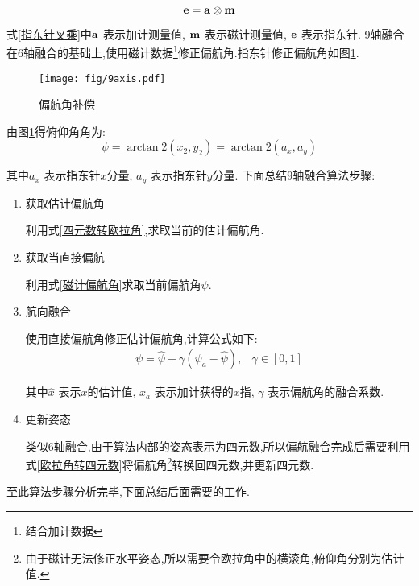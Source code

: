 \begin{equation}\label{指东针叉乘}
    \mathbf{e} = \mathbf{a} \otimes \mathbf{m}
\end{equation} 

式\ref{指东针叉乘}中$\mathbf{a}$   表示加计测量值,
$\mathbf{m}$       表示磁计测量值,
$\mathbf{e}$       表示指东针.
9轴融合在6轴融合的基础上,使用磁计数据\footnote{结合加计数据}修正偏航角.指东针修正偏航角如图\ref{偏航角补偿}.
\begin{figure}[h]
\begin{center}
    \texttt{[image: fig/9axis.pdf]}
    \caption{偏航角补偿}\label{偏航角补偿}
\end{center}
\end{figure}
由图\ref{偏航角补偿}得俯仰角角为:
\begin{equation}\label{磁计偏航角}
    \psi = \arctan2(x_2,y_2) = \arctan2(a_x,a_y)
\end{equation} 

其中$a_x$   表示指东针$x$分量,
$a_y$       表示指东针$y$分量.
下面总结9轴融合算法步骤:
\begin{enumerate}
    \item 获取估计偏航角

        利用式\ref{四元数转欧拉角},求取当前的估计偏航角.
    \item 获取当直接偏航

        利用式\ref{磁计偏航角}求取当前偏航角$\psi$.
    \item 航向融合

        使用直接偏航角修正估计偏航角,计算公式如下:
        \begin{equation}\label{偏航融合}
            \begin{array}{ll}
                    \psi   = \hat{\psi} + \gamma(\psi_a - \hat{\psi}), & \gamma \in [0, 1]
            \end{array}
        \end{equation} 
            
            其中$\hat{x}$   表示$x$的估计值, 
            $x_a$           表示加计获得的$x$指,
            $\gamma$        表示偏航角的融合系数.
    \item 更新姿态

        类似6轴融合,由于算法内部的姿态表示为四元数,所以偏航融合完成后需要利用式\ref{欧拉角转四元数}将偏航角\footnote{由于磁计无法修正水平姿态,所以需要令欧拉角中的横滚角,俯仰角分别为估计值.}转换回四元数,并更新四元数.
\end{enumerate}

至此算法步骤分析完毕,下面总结后面需要的工作.


